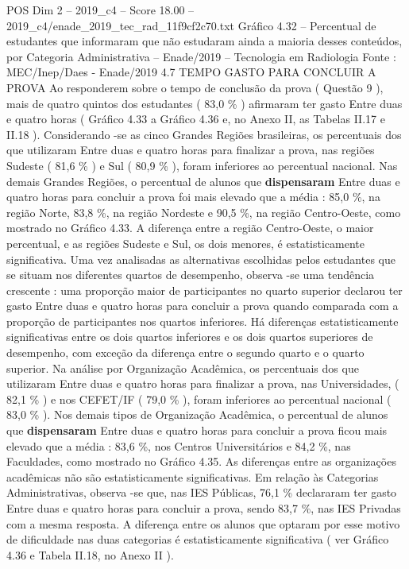 \begin{textsample}{POS Dim 2 – 2019\_c4 – Score 18.00 – 2019\_c4/enade\_2019\_tec\_rad\_11f9cf2c70.txt}
Gráfico 4.32 – Percentual de estudantes que informaram que não estudaram ainda a maioria desses conteúdos, por Categoria Administrativa – Enade/2019 – Tecnologia em Radiologia Fonte : MEC/Inep/Daes - Enade/2019 4.7 TEMPO GASTO PARA CONCLUIR A PROVA Ao responderem sobre o tempo de conclusão da prova ( Questão 9 ), mais de quatro quintos dos estudantes ( 83,0 \% ) afirmaram ter gasto Entre duas e quatro horas ( Gráfico 4.33 a Gráfico 4.36 e, no Anexo II, as Tabelas II.17 e II.18 ).
Considerando -se as cinco Grandes Regiões brasileiras, os percentuais dos que utilizaram Entre duas e quatro horas para finalizar a prova, nas regiões Sudeste ( 81,6 \% ) e Sul ( 80,9 \% ), foram inferiores ao percentual nacional.
Nas demais Grandes Regiões, o percentual de alunos que \textbf{dispensaram} Entre duas e quatro horas para concluir a prova foi mais elevado que a média : 85,0 \%, na região Norte, 83,8 \%, na região Nordeste e 90,5 \%, na região Centro-Oeste, como mostrado no Gráfico 4.33.
A diferença entre a região Centro-Oeste, o maior percentual, e as regiões Sudeste e Sul, os dois menores, é estatisticamente significativa.
Uma vez analisadas as alternativas escolhidas pelos estudantes que se situam nos diferentes quartos de desempenho, observa -se uma tendência crescente : uma proporção maior de participantes no quarto superior declarou ter gasto Entre duas e quatro horas para concluir a prova quando comparada com a proporção de participantes nos quartos inferiores.
Há diferenças estatisticamente significativas entre os dois quartos inferiores e os dois quartos superiores de desempenho, com exceção da diferença entre o segundo quarto e o quarto superior.
Na análise por Organização Acadêmica, os percentuais dos que utilizaram Entre duas e quatro horas para finalizar a prova, nas Universidades, ( 82,1 \% ) e nos CEFET/IF ( 79,0 \% ), foram inferiores ao percentual nacional ( 83,0 \% ).
Nos demais tipos de Organização Acadêmica, o percentual de alunos que \textbf{dispensaram} Entre duas e quatro horas para concluir a prova ficou mais elevado que a média : 83,6 \%, nos Centros Universitários e 84,2 \%, nas Faculdades, como mostrado no Gráfico 4.35.
As diferenças entre as organizações acadêmicas não são estatisticamente significativas.
Em relação às Categorias Administrativas, observa -se que, nas IES Públicas, 76,1 \% declararam ter gasto Entre duas e quatro horas para concluir a prova, sendo 83,7 \%, nas IES Privadas com a mesma resposta.
A diferença entre os alunos que optaram por esse motivo de dificuldade nas duas categorias é estatisticamente significativa ( ver Gráfico 4.36 e Tabela II.18, no Anexo II ).

\end{textsample}
